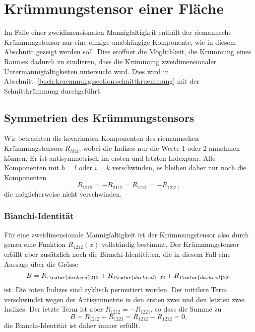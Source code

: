 %
%
\section{Krümmungstensor einer Fläche}
Im Falle einer zweidimensionalen Mannigfaltigkeit enthält der
riemannsche Krümmungstensor nur eine einzige unabhängige Komponente,
wie in diesem Abschnitt gezeigt werden soll.
Dies eröffnet die Möglichkeit, die Krümmung eines Raumes dadurch zu
studieren, dass die Krümmung zweidimensionaler Untermannigfaltigkeiten
untersucht wird.
Dies wird in Abschnitt~\ref{buch:kruemmung:section:schnittkruemmung}
mit der Schnittkrümmung durchgeführt.

%
%
\subsection{Symmetrien des Krümmungstensors}
Wir betrachten die kovarianten Komponenten des riemannschen
Krümmungstensors $R_{hlik}$, wobei die Indizes nur die Werte 1 oder 2
annehmen können.
Er ist antisymmetrisch im ersten und letzten Indexpaar.
Alle Komponenten mit $h=l$ oder $i=k$ verschwinden, es bleiben daher
nur noch die Komponenten
\[
R_{1212}
=
-R_{2112}
=
R_{2121}
=
-R_{1221},
\]
die möglicherweise nicht verschwinden.

\subsubsection{Bianchi-Identität}
Für eine zweidimensionale Mannigfaltigkeit ist der Krümmungstensor also
durch genau eine Funktion $R_{1212}(x)$ vollständig bestimmt.
Der Krümmungstensor erfüllt aber zusätzlich noch die Bianchi-Identitäten,
die in diesem Fall eine Aussage über die Grösse
\[
B
=
R_{1{\color{darkred}212}}
+
R_{1{\color{darkred}122}}
+
R_{1{\color{darkred}221}}
\]
ist.
Die roten Indizes sind zyklisch permutiert worden.
Der mittlere Term verschwindet wegen der Antisymmetrie in den ersten
zwei und den letzten zwei Indizes.
Der letzte Term ist aber $R_{1212}=-R_{1221}$, so dass die Summe zu
\[
B
=
R_{1212}+R_{1221}
=
R_{1212}-R_{1212}
=
0,
\]
die Bianchi-Identität ist daher immer erfüllt.

